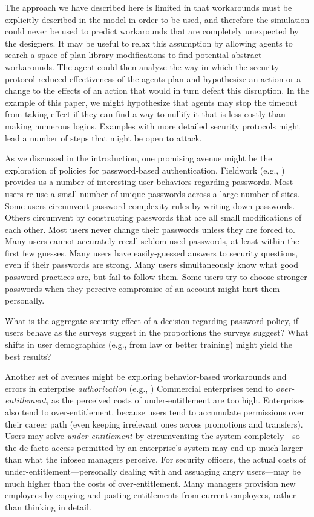 \documentclass{acm_proc_article-sp}
\begin{document}
The approach we have described here is limited in that workarounds
must be explicitly described in the model in order to be used, and
therefore the simulation could never be used to predict workarounds
that are completely unexpected by the designers. It may be useful to
relax this assumption by allowing agents to search a space of plan
library modifications to find potential abstract workarounds. The
agent could then analyze the way in which the security protocol
reduced effectiveness of the agents plan and hypothesize an action or
a change to the effects of an action that would in turn defeat this
disruption. In the example of this paper, we might hypothesize that
agents may stop the timeout from taking effect if they can find a way
to nullify it that is less costly than making numerous
logins. Examples with more detailed security protocols might lead a
number of steps that might be open to attack.

As we discussed in the introduction, one promising avenue might be the
exploration of policies for password-based authentication. Fieldwork
(e.g., \cite{BS03, riley2006password, DP00, schechter2009s,
  schechter2007emperor, florencio2007large, gaw2006password}) provides
us a number of interesting user behaviors regarding passwords.  Most
users re-use a small number of unique passwords across a large number
of sites.  Some users circumvent password complexity rules by writing
down passwords.  Others circumvent by constructing passwords that are
all small modifications of each other.  Most users never change their
passwords unless they are forced to.  Many users cannot accurately
recall seldom-used passwords, at least within the first few guesses.
Many users have easily-guessed answers to security questions, even if
their passwords are strong.  Many users simultaneously know what good
password practices are, but fail to follow them.  Some users try to
choose stronger passwords when they perceive compromise of an account
might hurt them personally.

What is the aggregate security effect of a decision regarding password
policy, if users behave as the surveys suggest in the proportions the
surveys suggest?  What shifts in user demographics (e.g., from law or
better training) might yield the best results?

Another set of avenues might be exploring behavior-based workarounds and 
errors in enterprise {\em authorization}
(e.g., \cite{Scout08a, SS08, Scout10})
Commercial enterprises tend to {\em over-entitlement}, as the perceived costs of under-entitlement are too high.
Enterprises also tend to over-entitlement, because users tend
to accumulate permissions over their career path (even keeping irrelevant ones across promotions and transfers).
Users may solve {\em under-entitlement} by circumventing the system completely---so the de facto access permitted by an enterprise's system may end up much larger than what the infosec managers perceive.
For security officers, the actual costs of under-entitlement---personally dealing with and assuaging angry users---may be much higher than the costs of over-entitlement.
Many managers provision new employees by copying-and-pasting 
entitlements from current employees, rather than thinking in detail.
\end{document}
